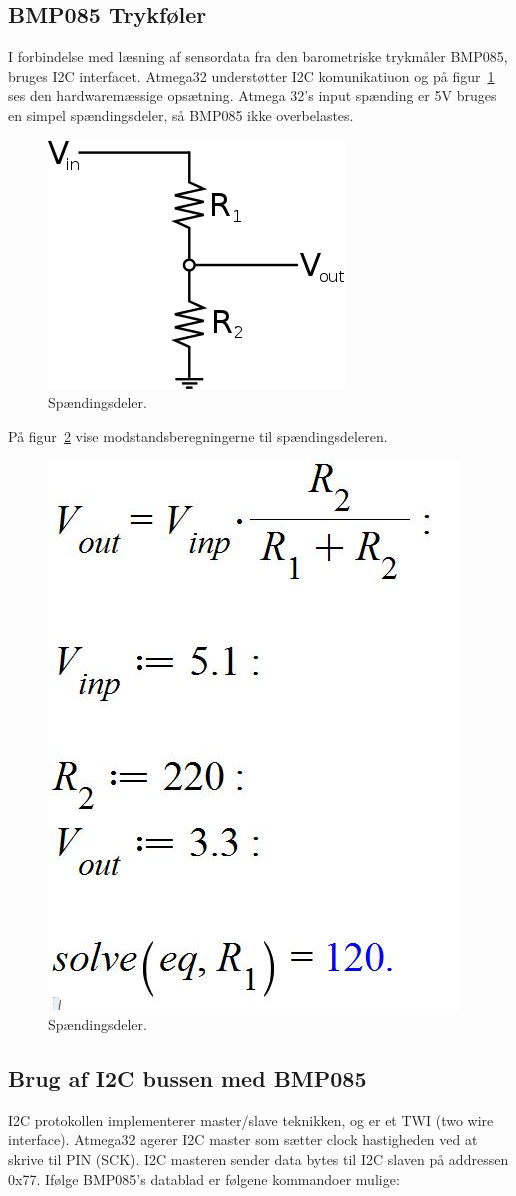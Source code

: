 \subsection{BMP085 Trykføler}

I forbindelse med læsning af sensordata fra den barometriske trykmåler BMP085, bruges I2C interfacet. Atmega32 understøtter I2C komunikatiuon og på figur~\ref{fig:voltagedivider} ses den hardwaremæssige opsætning. Atmega 32’s input spænding er 5V bruges en simpel spændingsdeler, så BMP085 ikke overbelastes.


\begin{figure}[h]
	\centering
	\includegraphics[width=0.3\linewidth]{figs/voltage_divider}
	\caption{Spændingsdeler.}
	\label{fig:voltagedivider}
\end{figure}

På figur~\ref{fig:voltagediv} vise modstandsberegningerne til spændingsdeleren.



\begin{figure}[h]
	\centering
	\includegraphics[width=0.3\linewidth]{figs/voltage_div}
	\caption{Spændingsdeler.}
	\label{fig:voltagediv}
\end{figure}

\subsection{Brug af I2C bussen med BMP085}

I2C protokollen implementerer master/slave teknikken, og er et TWI (two wire interface). 
Atmega32 agerer I2C master som sætter clock hastigheden ved at skrive til PIN (SCK). I2C masteren sender data bytes til I2C slaven på addressen 0x77.
Ifølge BMP085’s datablad er følgene kommandoer mulige:

